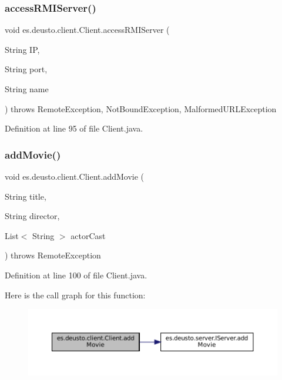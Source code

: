 \subsubsection{\texorpdfstring{accessRMIServer()}{accessRMIServer()}}
{\footnotesize\ttfamily void es.\+deusto.\+client.\+Client.\+access\+R\+M\+I\+Server (\begin{DoxyParamCaption}\item[{String}]{IP,  }\item[{String}]{port,  }\item[{String}]{name }\end{DoxyParamCaption}) throws Remote\+Exception, Not\+Bound\+Exception, Malformed\+U\+R\+L\+Exception}



Definition at line 95 of file Client.\+java.

\mbox{\label{classes_1_1deusto_1_1client_1_1_client_ab3ebcc9daf4719fe0c9354a49d5957e4}} 
\subsubsection{\texorpdfstring{addMovie()}{addMovie()}}
{\footnotesize\ttfamily void es.\+deusto.\+client.\+Client.\+add\+Movie (\begin{DoxyParamCaption}\item[{String}]{title,  }\item[{String}]{director,  }\item[{List$<$ String $>$}]{actor\+Cast }\end{DoxyParamCaption}) throws Remote\+Exception}



Definition at line 100 of file Client.\+java.

Here is the call graph for this function\+:
\nopagebreak
\begin{figure}[H]
\begin{center}
\leavevmode
\includegraphics[width=350pt]{classes_1_1deusto_1_1client_1_1_client_ab3ebcc9daf4719fe0c9354a49d5957e4_cgraph}
\end{center}
\end{figure}
\mbox{\label{classes_1_1deusto_1_1client_1_1_client_a8bbc4a71a4aaff50bfe419a724898790}} 
